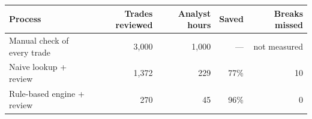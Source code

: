 \begin{tabular}{@{}lrrrr@{}}
\toprule
\textbf{Process} & \textbf{Trades reviewed} & \textbf{Analyst hours} & \textbf{Saved} & \textbf{Breaks missed} \\
\midrule
Manual check of every trade & 3,000 & 1,000 & --- & not measured \\
Naive lookup + review & 1,372 & 229 & 77\% & 10 \\
Rule-based engine + review & 270 & 45 & 96\% & 0 \\
\bottomrule
\end{tabular}